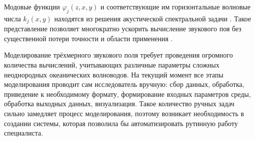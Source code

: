 \documentclass[12pt]{fefu}
\newcommand{\pa}[1]{\left(#1\right)}
\begin{document}
    Модовые функции $\varphi_j\pa{z,x,y}$ и соответствующие им горизонтальные волновые числа $k_j\pa{x,y}$ находятся из решения акустической спектральной задачи \cite{jensen}. Такое представление позволяет многократно ускорить вычисление звукового поя без существенной потери точности и области применения \cite{dd}.
    \par Моделирование трёхмерного звукового поля требует проведения огромного количества вычислений, учитывающих различные параметры сложных неоднородных океанических волноводов. На текущий момент все этапы моделирования проводит сам исследователь вручную: сбор данных, обработка, приведение к необходимому формату, формирование входных параметров среды, обработка выходных данных, визуализация. Такое количество ручных задач сильно замедляет процесс моделирования, поэтому возникает необходимость в создании системы, которая позволила бы автоматизировать рутинную работу специалиста.
    \vskip 12pt
    \begingroup
        
        
    \endgroup
\end{document}
